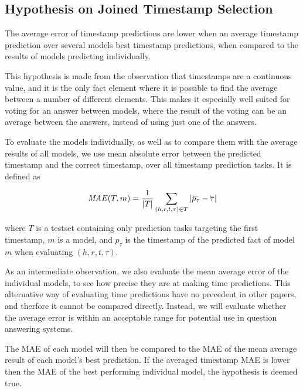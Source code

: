 \subsection{Hypothesis on Joined Timestamp Selection}
\label{sec:hypothesis_timestamp_voting}

\begin{hypothesis}
\label{hyp:timestamp_voting}
The average error of timestamp predictions are lower when an average timestamp prediction over several models best timestamp predictions, when compared to the results of models predicting individually.
\end{hypothesis}

This hypothesis is made from the observation that timestamps are a continuous value, and it is the only fact element where it is possible to find the average between a number of different elements. This makes it especially well suited for voting for an answer between models, where the result of the voting can be an average between the answers, instead of using just one of the answers.

To evaluate the models individually, as well as to compare them with the average results of all models, we use mean absolute error between the predicted timestamp and the correct timestamp, over all timestamp prediction tasks. It is defined as

\begin{equation}
\mathit{MAE}(T, m) = \frac{1}{|T|} \varsum_{(h, r, t, \tau) \in T} | \timebegin{p_\tau} - \timebegin{\tau} |
\end{equation}

\noindent
where $T$ is a testset containing only prediction tasks targeting the first timestamp, $m$ is a model, and $p_\tau$ is the timestamp of the predicted fact of model $m$ when evaluating $(h, r, t, \tau)$.

As an intermediate observation, we also evaluate the mean average error of the individual models, to see how precise they are at making time predictions. This alternative way of evaluating time predictions have no precedent in other papers, and therfore it cannot be compared directly. Instead, we will evaluate whether the average error is within an acceptable range for potential use in question answering systems.

The MAE of each model will then be compared to the MAE of the mean average result of each model's best prediction. If the averaged timestamp MAE is lower then the MAE of the best performing individual model, the hypothesis is deemed true.




